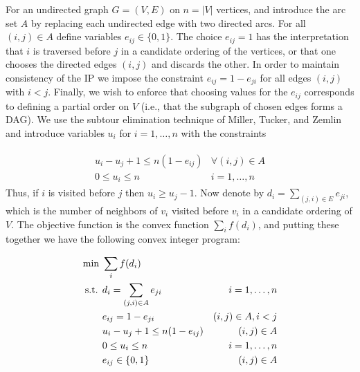\documentclass[english]{llncs}
\begin{document}
For an undirected graph $G = (V,E)$ on $n = |V|$ vertices, and introduce the
arc set $A$ by replacing each undirected edge with two directed arcs.  For all
$(i,j)\in A$ define variables $e_{ij} \in \{ 0,1 \}$.  The choice $e_{ij} = 1$
has the interpretation that $i$ is traversed before $j$ in a candidate ordering
of the vertices, or that one chooses the directed edges $(i,j)$ and discards
the other. In order to maintain consistency of the IP we impose the constraint
$e_{ij} = 1 - e_{ji}$ for all edges $(i,j)$ with $i < j$. Finally, we wish to
enforce that choosing values for the $e_{ij}$ corresponds to defining a partial
order on $V$ (i.e., that the subgraph of chosen edges forms a DAG). We use the
subtour elimination technique of Miller, Tucker, and Zemlin
\cite{miller1960integer} and introduce variables $u_i$ for $i = 1, \dots, n$
with the constraints

\begin{align}
\label{eq:dag-constraint}
\begin{matrix}
   u_i - u_j + 1 \leq n (1 - e_{ij}) & \forall (i,j) \in A \\ 
   0 \leq u_i \leq n & i = 1, \dots, n 
\end{matrix}
\end{align}
\noindent Thus, if $i$ is visited before $j$ then $u_i \geq u_j - 1$.
Now denote by $d_i = \sum_{(j,i) \in E} e_{ji}$, which is the number of
neighbors of $v_i$ visited before $v_i$ in a candidate ordering of $V$. The
objective function is the convex function $\sum_{i} f(d_i)$, and putting these
together we have the following convex integer program: 

\begin{figure}[th]
\begin{centering}
\begin{align*}
\textup{min }  & \sum_i f(d_i)                       & \\ 
\textup{s.t. } & d_i = \sum_{(j,i) \in A} e_{ji}     & i = 1, \dots, n \\ 
               & e_{ij} = 1 - e_{ji}                 & (i,j) \in A, i < j \\ 
               & u_i - u_j + 1 \leq n (1 - e_{ij})   & (i,j) \in A \\ 
               & 0 \leq u_i \leq n                   & i = 1, \dots, n \\ 
               & e_{ij} \in \{0,1\}                    & (i,j) \in A
\end{align*}
\end{centering}
\end{figure}
\end{document}
